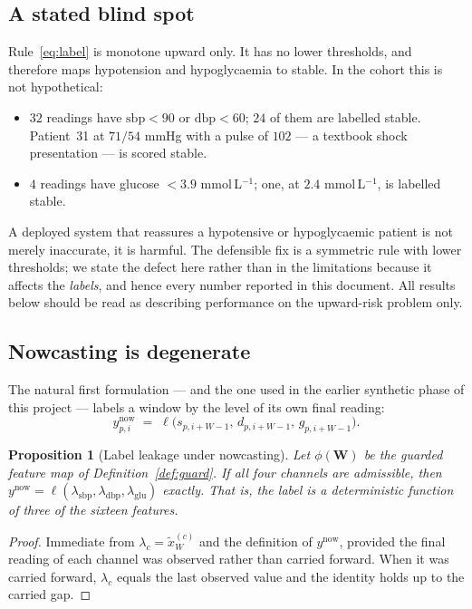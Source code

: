 \documentclass[11pt,a4paper]{article}
\newtheorem{proposition}{Proposition}
\newcommand{\sbp}{\mathrm{sbp}}
\newcommand{\dbp}{\mathrm{dbp}}
\newcommand{\glu}{\mathrm{glu}}
\begin{document}
\subsection{A stated blind spot}

Rule~\eqref{eq:label} is monotone upward only. It has no lower thresholds, and
therefore maps hypotension and hypoglycaemia to \textsf{stable}. In the cohort
this is not hypothetical:

\begin{itemize}
\item $32$ readings have $\sbp<90$ or $\dbp<60$; $24$ of them are labelled
      \textsf{stable}. Patient~31 at $71/54$ mmHg with a pulse of $102$ --- a
      textbook shock presentation --- is scored \textsf{stable}.
\item $4$ readings have glucose $<3.9$ mmol\,L$^{-1}$; one, at
      $2.4$ mmol\,L$^{-1}$, is labelled \textsf{stable}.
\end{itemize}

A deployed system that reassures a hypotensive or hypoglycaemic patient is not
merely inaccurate, it is harmful. The defensible fix is a symmetric rule with
lower thresholds; we state the defect here rather than in the limitations because
it affects the \emph{labels}, and hence every number reported in this document.
All results below should be read as describing performance on the upward-risk
problem only.

\subsection{Nowcasting is degenerate}
\label{sec:leakage}

The natural first formulation --- and the one used in the earlier synthetic phase
of this project --- labels a window by the level of its own final reading:
\[
  y^{\text{now}}_{p,i} \;=\; \ell\bigl(s_{p,i+W-1},\, d_{p,i+W-1},\, g_{p,i+W-1}\bigr).
\]

\begin{proposition}[Label leakage under nowcasting]
\label{prop:leak}
Let $\phi(\mathbf{W})$ be the guarded feature map of Definition~\ref{def:guard}.
If all four channels are admissible, then
$y^{\text{now}} = \ell(\lambda_{\sbp}, \lambda_{\dbp}, \lambda_{\glu})$ exactly.
That is, the label is a deterministic function of three of the sixteen features.
\end{proposition}

\begin{proof}
Immediate from $\lambda_c = \tilde{x}^{(c)}_W$ and the definition of
$y^{\text{now}}$, provided the final reading of each channel was observed rather
than carried forward. When it was carried forward, $\lambda_c$ equals the last
observed value and the identity holds up to the carried gap.
\end{proof}
\end{document}
